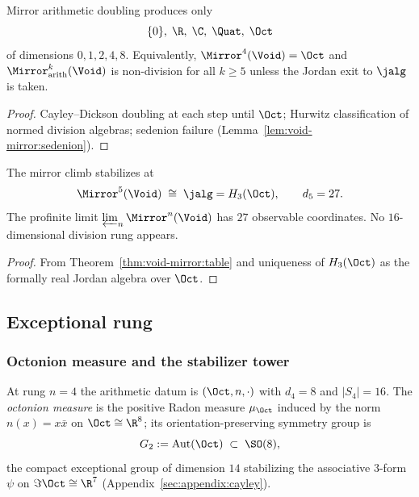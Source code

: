 \begin{theorem}[Hurwitz]\label{thm:ladder:hurwitz}
Mirror arithmetic doubling produces only
\[
  \{0\},\;\R,\;\C,\;\Quat,\;\Oct
\]
of dimensions $0,1,2,4,8$. Equivalently, $\Mirror^4(\Void)=\Oct$ and
$\Mirror^k_{\mathrm{arith}}(\Void)$ is non-division for all $k\geq5$ unless the
Jordan exit to $\jalg$ is taken.
\end{theorem}

\begin{proof}
Cayley--Dickson doubling at each step until $\Oct$; Hurwitz classification of
normed division algebras; sedenion failure
(Lemma~\ref{lem:void-mirror:sedenion}).
\end{proof}

\begin{proposition}\label{prop:ladder:terminal}
The mirror climb stabilizes at
\[
  \Mirror^5(\Void)\;\cong\;\jalg=H_3(\Oct),
  \qquad d_5=27.
\]
The profinite limit $\varprojlim_n\Mirror^n(\Void)$ has $27$ observable
coordinates. No $16$-dimensional division rung appears.
\end{proposition}

\begin{proof}
From Theorem~\ref{thm:void-mirror:table} and uniqueness of $H_3(\Oct)$ as the
formally real Jordan algebra over $\Oct$.
\end{proof}

\subsection{Exceptional rung}
\label{sec:ladder:exceptional}

\subsubsection{Octonion measure and the stabilizer tower}
\label{sec:ladder:oct-measure}

At rung $n=4$ the arithmetic datum is $(\Oct,n,\cdot)$ with $d_4=8$ and
$|S_4|=16$. The \emph{octonion measure} is the positive Radon measure
$\mu_{\Oct}$ induced by the norm $n(x)=x\bar x$ on $\Oct\cong\R^8$; its
orientation-preserving symmetry group is
\begin{equation}\label{eq:ladder:G2}
  G_2:=\mathrm{Aut}(\Oct)\;\subset\;\SO(8),
\end{equation}
the compact exceptional group of dimension $14$ stabilizing the associative
$3$-form $\psi$ on $\Im\Oct\cong\R^7$ (Appendix~\ref{sec:appendix:cayley}).

